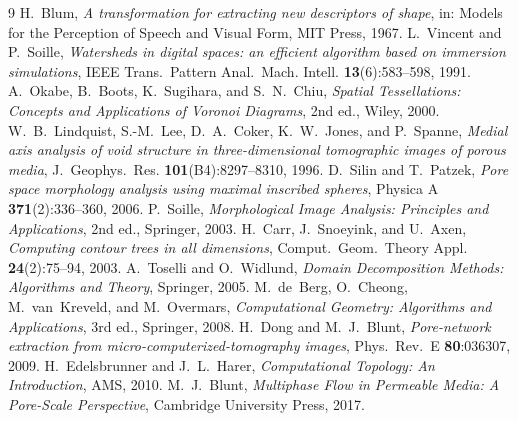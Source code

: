 \documentclass[UTF8,zihao=-4]{ctexart}
\begin{document}
\begin{thebibliography}{9}
H.~Blum, \emph{A transformation for extracting new descriptors of shape},
in: Models for the Perception of Speech and Visual Form, MIT Press, 1967.
L.~Vincent and P.~Soille, \emph{Watersheds in digital spaces: an efficient
algorithm based on immersion simulations}, IEEE Trans.~Pattern Anal.~Mach.
Intell. \textbf{13}(6):583--598, 1991.
A.~Okabe, B.~Boots, K.~Sugihara, and S.~N.~Chiu, \emph{Spatial Tessellations:
Concepts and Applications of Voronoi Diagrams}, 2nd ed., Wiley, 2000.
W.~B.~Lindquist, S.-M.~Lee, D.~A.~Coker, K.~W.~Jones, and P.~Spanne,
\emph{Medial axis analysis of void structure in three-dimensional tomographic
images of porous media}, J.~Geophys.~Res. \textbf{101}(B4):8297--8310, 1996.
D.~Silin and T.~Patzek, \emph{Pore space morphology analysis using maximal
inscribed spheres}, Physica A \textbf{371}(2):336--360, 2006.
P.~Soille, \emph{Morphological Image Analysis: Principles and Applications},
2nd ed., Springer, 2003.
H.~Carr, J.~Snoeyink, and U.~Axen, \emph{Computing contour trees in all
dimensions}, Comput.~Geom.~Theory Appl. \textbf{24}(2):75--94, 2003.
A.~Toselli and O.~Widlund, \emph{Domain Decomposition Methods: Algorithms and
Theory}, Springer, 2005.
M.~de~Berg, O.~Cheong, M.~van~Kreveld, and M.~Overmars, \emph{Computational
Geometry: Algorithms and Applications}, 3rd ed., Springer, 2008.
H.~Dong and M.~J.~Blunt, \emph{Pore-network extraction from
micro-computerized-tomography images}, Phys.~Rev.~E \textbf{80}:036307, 2009.
H.~Edelsbrunner and J.~L.~Harer, \emph{Computational Topology: An
Introduction}, AMS, 2010.
M.~J.~Blunt, \emph{Multiphase Flow in Permeable Media: A Pore-Scale
Perspective}, Cambridge University Press, 2017.
\end{thebibliography}
\end{document}
